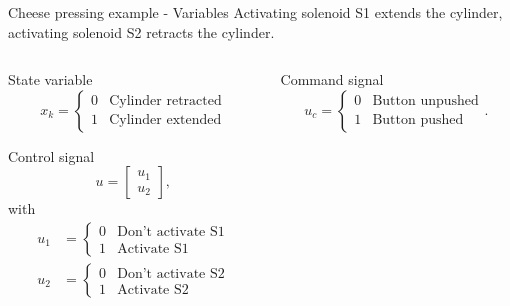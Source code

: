 \documentclass[presentation,aspectratio=1610]{beamer}
\begin{document}
\begin{frame}[label={sec:org3956e0f}]{Cheese pressing example - Variables}
Activating solenoid S1 extends the cylinder, activating solenoid S2 retracts the cylinder.
\begin{columns}
\begin{column}{0.5\columnwidth}
\begin{block}{State variable}
\[ x_k = \begin{cases} 0 & \text{Cylinder retracted}\\1 & \text{Cylinder extended}\end{cases}\]
\end{block}
\begin{block}{Control signal}
\[ u = \begin{bmatrix} u_1\\u_2 \end{bmatrix}, \]
with
\begin{align*}
u_1 &= \begin{cases} 0 & \text{Don't activate S1}\\1 & \text{Activate S1 }\end{cases}\\
u_2 &= \begin{cases} 0 & \text{Don't activate S2}\\1 & \text{Activate S2}\end{cases}\\
\end{align*}
\end{block}
\end{column}

\begin{column}{0.5\columnwidth}
\begin{block}{Command signal}
\[ u_{c} = \begin{cases} 0 & \text{Button unpushed}\\1 & \text{Button pushed}\end{cases}. \]
\end{block}
\end{column}
\end{columns}
\end{frame}
\end{document}

